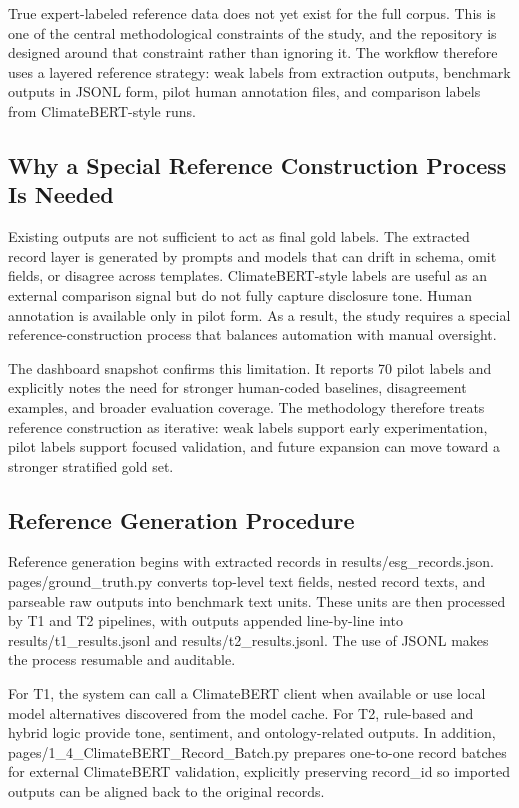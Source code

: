 True expert-labeled reference data does not yet exist for the full corpus. This is one of the central methodological constraints of the study, and the repository is designed around that constraint rather than ignoring it. The workflow therefore uses a layered reference strategy: weak labels from extraction outputs, benchmark outputs in JSONL form, pilot human annotation files, and comparison labels from ClimateBERT-style runs.

\subsection{Why a Special Reference Construction Process Is Needed}

Existing outputs are not sufficient to act as final gold labels. The extracted record layer is generated by prompts and models that can drift in schema, omit fields, or disagree across templates. ClimateBERT-style labels are useful as an external comparison signal but do not fully capture disclosure tone. Human annotation is available only in pilot form. As a result, the study requires a special reference-construction process that balances automation with manual oversight.

The dashboard snapshot confirms this limitation. It reports 70 pilot labels and explicitly notes the need for stronger human-coded baselines, disagreement examples, and broader evaluation coverage. The methodology therefore treats reference construction as iterative: weak labels support early experimentation, pilot labels support focused validation, and future expansion can move toward a stronger stratified gold set.

\subsection{Reference Generation Procedure}

Reference generation begins with extracted records in results/esg\_records.json. pages/ground\_truth.py converts top-level text fields, nested record texts, and parseable raw outputs into benchmark text units. These units are then processed by T1 and T2 pipelines, with outputs appended line-by-line into results/t1\_results.jsonl and results/t2\_results.jsonl. The use of JSONL makes the process resumable and auditable.

For T1, the system can call a ClimateBERT client when available or use local model alternatives discovered from the model cache. For T2, rule-based and hybrid logic provide tone, sentiment, and ontology-related outputs. In addition, pages/1\_4\_ClimateBERT\_Record\_Batch.py prepares one-to-one record batches for external ClimateBERT validation, explicitly preserving record\_id so imported outputs can be aligned back to the original records.

